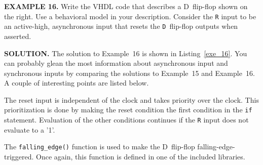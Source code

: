\begin{leftbar}
\begin{minipage}{0.5\linewidth}
\noindent
\textbf{EXAMPLE 16.}
Write the VHDL code that describes a D~flip-flop shown on the right. Use a behavioral model in your description. Consider the \texttt{R} input to be an active-high, asynchronous input that resets the \texttt{D}~flip-flop outputs when asserted.
\end{minipage}
\begin{minipage}{0.47\linewidth}
\begin{flushright}
\end{flushright}
\end{minipage}
\end{leftbar}
\noindent
\textbf{SOLUTION.} The solution to Example~16 is shown in Listing~\ref{exe_16}. You can probably glean the most information about asynchronous input and synchronous inputs by comparing the solutions to Example~15 and Example~16. A couple of interesting points are listed below.
\begin{my_list}
\item The reset input is independent of the clock and takes priority over the clock. This prioritization is done by making the reset condition the first condition in the \texttt{if} statement. Evaluation of the other conditions continues if the \texttt{R} input does not evaluate to a '1'.
\item The \texttt{falling\_edge()} function is used to make the D~flip-flop falling-edge-triggered. Once again, this function is defined in one of the included libraries.
\end{my_list}

